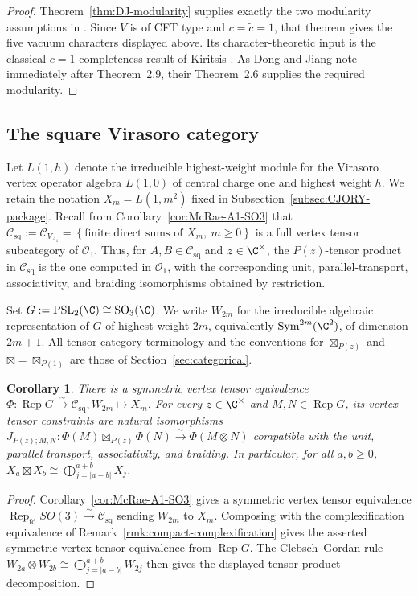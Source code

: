 \documentclass[12pt,leqno]{amsart}
\numberwithin{equation}{section} \newtheorem{thm}{Theorem}[section] \newtheorem{lem}[thm]{Lemma} \newtheorem{ex}[thm]{Example} \newtheorem{prop}[thm]{Proposition} \newtheorem{cor}[thm]{Corollary} \newtheorem{defi}[thm]{Definition} \newtheorem{rmk}[thm]{Remark} \newtheorem{notation}[thm]{Notation}
\newcommand{\Rep}{\operatorname{Rep}}
\newcommand{\Sym}{\operatorname{Sym}}
\newcommand{\SO}{\operatorname{SO}}
\newcommand{\Csq}{\mathcal C_{\mathrm{sq}}}
\newcommand{\Ovir}{\mathcal O_1}
\newcommand{\PSLtwo}{\operatorname{PSL}_2(\C)}
\begin{document}
\begin{proof}
Theorem~\ref{thm:DJ-modularity} supplies exactly the two modularity assumptions in \cite[Theorem~2.9]{DJA4}. Since $V$ is of CFT type and $c=\widetilde c=1$, that theorem gives the five vacuum characters displayed above. Its character-theoretic input is the classical $c=1$ completeness result of Kiritsis \cite{Kiritsis}. As Dong and Jiang note immediately after Theorem~2.9, their Theorem~2.6 supplies the required modularity.
\end{proof}

\subsection{The square Virasoro category}

Let $L(1,h)$ denote the irreducible highest-weight module for the Virasoro vertex operator algebra $L(1,0)$ of central charge one and highest weight $h$. We retain the notation $X_m=L(1,m^2)$ fixed in Subsection~\ref{subsec:CJORY-package}. Recall from Corollary~\ref{cor:McRae-A1-SO3} that \(\Csq:=\mathcal C_{V_{A_1}}=\left\{\text{finite direct sums of }X_m,\ m\ge0\right\}\) is a full vertex tensor subcategory of $\Ovir$. Thus, for $A,B\in\Csq$ and $z\in\C^\times$, the $P(z)$-tensor product in $\Csq$ is the one computed in $\Ovir$, with the corresponding unit, parallel-transport, associativity, and braiding isomorphisms obtained by restriction.

Set $G:=\PSLtwo\cong\SO_3(\C)$. We write $W_{2m}$ for the irreducible algebraic representation of $G$ of highest weight $2m$, equivalently $\Sym^{2m}(\C^2)$, of dimension $2m+1$. All tensor-category terminology and the conventions for $\boxtimes_{P(z)}$ and $\boxtimes=\boxtimes_{P(1)}$ are those of Section~\ref{sec:categorical}.

\begin{cor}
\label{thm:square-category}
There is a symmetric vertex tensor equivalence \(\Phi:\Rep G\overset{\sim}{\longrightarrow}\Csq, W_{2m}\longmapsto X_m\). For every $z\in\C^\times$ and $M,N\in\Rep G$, its vertex-tensor constraints are natural isomorphisms \(J_{P(z);M,N}:\Phi(M)\boxtimes_{P(z)}\Phi(N)\overset{\sim}{\longrightarrow}\Phi(M\otimes N)\) compatible with the unit, parallel transport, associativity, and braiding. In particular, for all $a,b\ge0$, \(X_a\boxtimes X_b\cong\bigoplus_{j=|a-b|}^{a+b}X_j\).
\end{cor}

\begin{proof}
Corollary~\ref{cor:McRae-A1-SO3} gives a symmetric vertex tensor equivalence \(\Rep_{\mathrm{fd}}SO(3)\overset{\sim}{\longrightarrow}\Csq\) sending \(W_{2m}\) to \(X_m\). Composing with the complexification equivalence of Remark~\ref{rmk:compact-complexification} gives the asserted symmetric vertex tensor equivalence from $\Rep G$. The Clebsch--Gordan rule \(W_{2a}\otimes W_{2b}\cong\bigoplus_{j=|a-b|}^{a+b}W_{2j}\) then gives the displayed tensor-product decomposition.
\end{proof}
\end{document}
